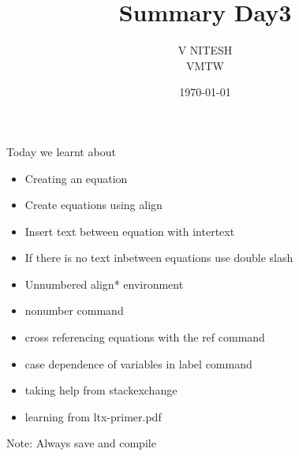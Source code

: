 \documentclass[12pt,a4paper]{article}
\title{Summary Day3}
\author{V NITESH \\ VMTW}
\date{\today}
\begin{document}
\maketitle
Today we learnt about
\begin{itemize}
\item Creating an equation
\item Create equations using align
\item Insert text between equation with intertext
\item If there is no text inbetween equations use double slash
\item Unnumbered align* environment
\item nonumber command
\item cross referencing equations with the ref command
\item case dependence of variables in label command
\item taking help from stackexchange
\item learning from ltx-primer.pdf

\end{itemize}

Note: Always save and compile
\end{document}
